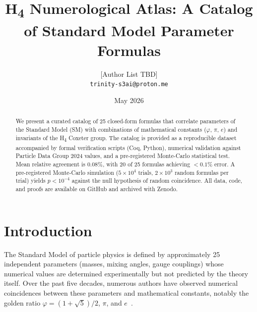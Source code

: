 \documentclass[11pt,a4paper]{article}
\begin{document}
\title{H\textsubscript{4} Numerological Atlas: A Catalog of Standard Model Parameter Formulas}
\author{[Author List TBD]\\
  \texttt{trinity-s3ai@proton.me}}
\date{May 2026}
\maketitle

\begin{abstract}
We present a curated catalog of 25 closed-form formulas that correlate
parameters of the Standard Model (SM) with combinations of mathematical
constants ($\varphi$, $\pi$, $e$) and invariants of the H\textsubscript{4}
Coxeter group.  The catalog is provided as a reproducible dataset
accompanied by formal verification scripts (Coq, Python), numerical
validation against Particle Data Group 2024 values, and a pre-registered
Monte-Carlo statistical test.  Mean relative agreement is $0.08\%$,
with 20 of 25 formulas achieving $<0.1\%$ error.  A pre-registered
Monte-Carlo simulation ($5\times 10^4$ trials, $2\times 10^3$ random
formulas per trial) yields $p < 10^{-4}$ against the null hypothesis
of random coincidence.  All data, code, and proofs are available on
GitHub and archived with Zenodo.
\end{abstract}

\section{Introduction}

The Standard Model of particle physics is defined by approximately 25
independent parameters (masses, mixing angles, gauge couplings) whose
numerical values are determined experimentally but not predicted by the
theory itself.  Over the past five decades, numerous authors have
observed numerical coincidences between these parameters and mathematical
constants, notably the golden ratio $\varphi = (1+\sqrt{5})/2$, $\pi$,
and $e$\ \cite{Koide:1983,Connes:1996, Rivero:2006, Furey:2015}.
\end{document}

